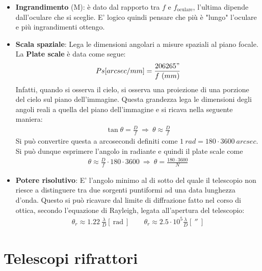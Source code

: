 \documentclass[a4paper, oneside]{book}
\begin{document}
\begin{itemize}
    \item \textbf{Ingrandimento} (M): è dato dal rapporto tra $f$ e $f_{\text{oculare}}$, l'ultima dipende dall'oculare che si sceglie. 
    E' logico quindi pensare che più è "lungo" l'oculare e più ingrandimenti ottengo.
    \item \textbf{Scala spaziale}: Lega le dimensioni angolari a misure spaziali al piano focale. La \textbf{Plate scale} è data come
    segue:
    \begin{gather*}
        Ps [arcsec/mm] = \frac{206265"}{f \ (mm)}
    \end{gather*}
    Infatti, quando si osserva il cielo, si osserva una proiezione di una porzione
    del cielo sul piano dell'immagine. Questa grandezza lega le dimensioni degli angoli reali a quella
    del piano dell'immagine e si ricava nella seguente maniera: 
    \begin{gather*}
        \tan \theta = \frac{D}{f} \ \Longrightarrow \ \theta \approx \frac{D}{f}
    \end{gather*} 
    Si può convertire questa a arcosecondi definiti come
    $1 \ rad = 180 \cdot  3600 \ arcsec$. Si può dunque esprimere l'angolo in radiante e quindi il plate scale come
    \begin{gather*}
        \theta \approx \frac{D}{f} \cdot  180 \cdot  3600 \ \Longrightarrow \ \theta = \frac{180\cdot 3600}{N}
    \end{gather*}
    \item \textbf{Potere risolutivo}: E' l'angolo minimo al di sotto del quale il telescopio non riesce a distinguere 
    tra due sorgenti puntiformi ad una data lunghezza d'onda. Questo si può ricavare dal limite di diffrazione
    fatto nel corso di ottica, secondo l'equazione di Rayleigh, legata all'apertura del telescopio:
    \begin{gather*}
        \theta_r \approx 1.22 \  \frac{\lambda}{D}[\ \text{rad} \ ] \quad \quad \theta_r \approx 2.5 \cdot  10^{5} \frac{\lambda}{D} [\ ''\ ]
    \end{gather*}
\end{itemize}

\section{Telescopi rifrattori}
\end{document}
